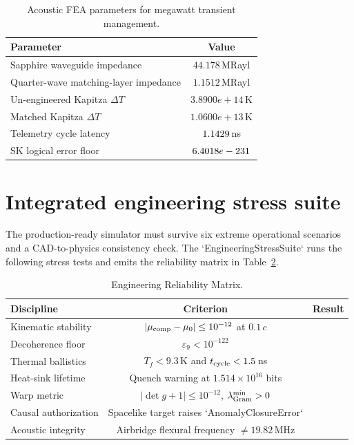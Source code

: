 \documentclass[aps,pra,10pt,onecolumn,superscriptaddress,nofootinbib,longbibliography,floatfix]{revtex4-2}
\newcommand{\ExoticKapitzaDropUnengineered}{3.8900e+14}%
\newcommand{\ExoticKapitzaDropMatched}{1.0600e+13}%
\begin{document}
\begin{table}[!ht]
\caption{Acoustic FEA parameters for megawatt transient management.}
\label{tab:acousticfea}
\begin{tabular}{lc}
\hline\hline
Parameter & Value \\
\hline
Sapphire waveguide impedance & $44.178\,$MRayl \\
Quarter-wave matching-layer impedance & $1.1512\,$MRayl \\
Un-engineered Kapitza $\Delta T$ & $\ExoticKapitzaDropUnengineered\,$K \\
Matched Kapitza $\Delta T$ & $\ExoticKapitzaDropMatched\,$K \\
Telemetry cycle latency & $1.1429\,$ns \\
SK logical error floor & $6.4018e-231$ \\
\hline\hline
\end{tabular}
\end{table}

\FloatBarrier
\clearpage
\section{Integrated engineering stress suite}\label{sec:stress-suite}

The production-ready simulator must survive six extreme operational scenarios and a CAD-to-physics consistency check.  The `EngineeringStressSuite` runs the following stress tests and emits the reliability matrix in Table~\ref{tab:reliability}.

\begin{table}[!t]
\small
\caption{Engineering Reliability Matrix.}
\label{tab:reliability}
\begin{tabular}{@{}lcc@{}}
\hline\hline
Discipline & Criterion & Result \\
\hline
Kinematic stability & $|\mu_{\rm comp}-\mu_0|\le10^{-12}$ at $0.1\,c$ & \ExoticScenarioAStatus{} \\
Decoherence floor & $\varepsilon_9 < 10^{-122}$ & \ExoticScenarioBStatus{} \\
Thermal ballistics & $T_f < 9.3\,$K and $t_{\rm cycle}<1.5\,$ns & \ExoticScenarioCStatus{} \\
Heat-sink lifetime & Quench warning at $1.514\times10^{16}$ bits & \ExoticScenarioDStatus{} \\
Warp metric & $|\det g +1|\le10^{-12}$, $\lambda_{\rm Gram}^{\min}>0$ & \ExoticScenarioEStatus{} \\
Causal authorization & Spacelike target raises `AnomalyClosureError` & \ExoticScenarioFStatus{} \\
Acoustic integrity & Airbridge flexural frequency $\neq 19.82\,$MHz & \ExoticStressAllPass{} \\
\hline\hline
\end{tabular}
\end{table}
\end{document}
